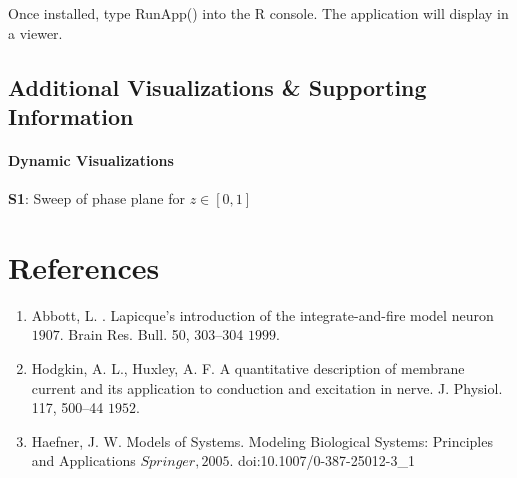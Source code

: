 \documentclass[11pt]{report}
\begin{document}
Once installed, type RunApp() into the R console. The application will display in a viewer.


\section{Additional Visualizations \& Supporting Information} %
\label{sec:web_app}


\subsubsection{Dynamic Visualizations} %
\label{ssub:dynamic_visualizations}



\textbf{S1}: Sweep of phase plane for $z \in [0,1]$



\chapter{References} %
\label{sec:references}

\begin{enumerate}
  \item Abbott, L. . Lapicque’s introduction of the integrate-and-fire model neuron \(1907\). Brain Res. Bull. 50, 303–304 \(1999\).
  \item Hodgkin, A. L., Huxley, A. F. A quantitative description of membrane current and its application to conduction and excitation in nerve. J. Physiol. 117, 500–44 \(1952\).
  \item Haefner, J. W. Models of Systems. Modeling Biological Systems: Principles and Applications \(Springer, 2005\). doi:10.1007/0-387-25012-3\_1
\end{enumerate}


\end{document}
